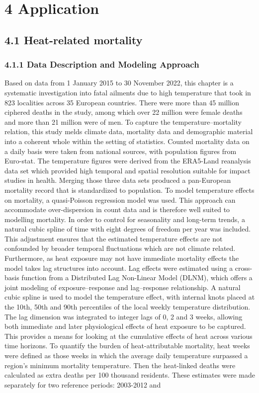 \documentclass[
]{krantz}
\begin{document}
\chapter{4 Application}\label{application}

\section{4.1 Heat-related mortality}\label{heat-related-mortality}

\subsection{4.1.1 Data Description and Modeling Approach}\label{data-description-and-modeling-approach}

Based on data from 1 January 2015 to 30 November 2022, this chapter is a systematic investigation into fatal ailments due to high temperature that took in 823 localities across 35 European countries. There were more than 45 million ciphered deaths in the study, among which over 22 million were female deaths and more than 21 million were of men. To capture the temperature--mortality relation, this study melds climate data, mortality data and demographic material into a coherent whole within the setting of statistics. Counted mortality data on a daily basis were taken from national sources, with population figures from Euro-stat. The temperature figures were derived from the ERA5-Land reanalysis data set which provided high temporal and spatial resolution suitable for impact studies in health. Merging those three data sets produced a pan-European mortality record that is standardized to population. To model temperature effects on mortality, a quasi-Poisson regression model was used. This approach can accommodate over-dispersion in count data and is therefore well suited to modelling mortality. In order to control for seasonality and long-term trends, a natural cubic spline of time with eight degrees of freedom per year was included. This adjustment ensures that the estimated temperature effects are not confounded by broader temporal fluctuations which are not climate related. Furthermore, as heat exposure may not have immediate mortality effects the model takes lag structures into account. Lag effects were estimated using a cross-basis function from a Distributed Lag Non-Linear Model (DLNM), which offers a joint modeling of exposure--response and lag--response relationship. A natural cubic spline is used to model the temperature effect, with internal knots placed at the 10th, 50th and 90th percentiles of the local weekly temperature distribution. The lag dimension was integrated to integer lags of 0, 2 and 3 weeks, allowing both immediate and later physiological effects of heat exposure to be captured. This provides a means for looking at the cumulative effects of heat across various time horizons. To quantify the burden of heat-attributable mortality, heat weeks were defined as those weeks in which the average daily temperature surpassed a region's minimum mortality temperature. Then the heat-linked deaths were calculated as extra deaths per 100 thousand residents. These estimates were made separately for two reference periods: 2003-2012 and 
\end{document}
